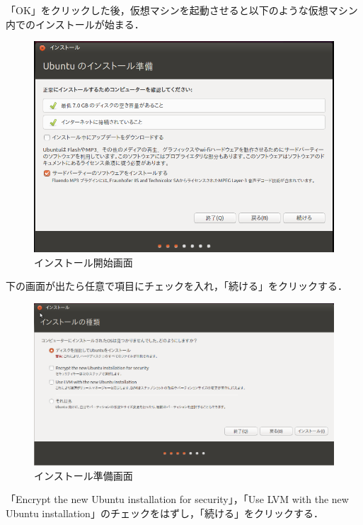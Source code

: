 「OK」をクリックした後，仮想マシンを起動させると以下のような仮想マシン内でのインストールが始まる．

\begin{figure}[htb]
\centering
\includegraphics[width=15cm]{ubuntuinstall1.png}
\caption{インストール開始画面}\label{インストール開始画面}
\end{figure}

下の画面が出たら任意で項目にチェックを入れ，「続ける」をクリックする．
\begin{figure}[htb]
\centering
\includegraphics[width=15cm]{ubuntuinstall2.png}
\caption{インストール準備画面}\label{インストール準備画面}
\end{figure}

「Encrypt the new Ubuntu installation for security」，「Use LVM with the new Ubuntu installation」のチェックをはずし，「続ける」をクリックする．


